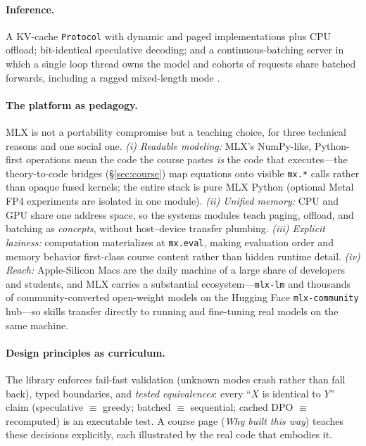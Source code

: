 \paragraph{Inference.} A KV-cache \texttt{Protocol} with dynamic and paged
\citep{kwon2023efficient} implementations plus CPU offload; bit-identical
speculative decoding; and a continuous-batching server in which a single loop
thread owns the model and cohorts of requests share batched forwards,
including a ragged mixed-length mode \citep{yu2022orca}.

\paragraph{The platform as pedagogy.} MLX is not a portability compromise
but a teaching choice, for three technical reasons and one social one.
\emph{(i) Readable modeling:} MLX's NumPy-like, Python-first operations mean
the code the course pastes \emph{is} the code that executes---the
theory-to-code bridges (\S\ref{sec:course}) map equations onto visible
\texttt{mx.*} calls rather than opaque fused kernels; the entire stack is
pure MLX Python (optional Metal FP4 experiments are isolated in one module).
\emph{(ii) Unified memory:} CPU and GPU share one address space, so the
systems modules teach paging, offload, and batching as \emph{concepts},
without host--device transfer plumbing. \emph{(iii) Explicit laziness:}
computation materializes at \texttt{mx.eval}, making evaluation order and
memory behavior first-class course content rather than hidden runtime
detail. \emph{(iv) Reach:} Apple-Silicon Macs are the daily machine of a
large share of developers and students, and MLX carries a substantial
ecosystem---\texttt{mlx-lm} and thousands of community-converted open-weight
models on the Hugging Face \texttt{mlx-community} hub---so skills transfer
directly to running and fine-tuning real models on the same machine.

\paragraph{Design principles as curriculum.} The library enforces
fail-fast validation (unknown modes crash rather than fall back), typed
boundaries, and \emph{tested equivalences}: every ``$X$ is identical to $Y$''
claim (speculative $\equiv$ greedy; batched $\equiv$ sequential; cached DPO
$\equiv$ recomputed) is an executable test. A course page
(\emph{Why built this way}) teaches these decisions explicitly, each
illustrated by the real code that embodies it.
